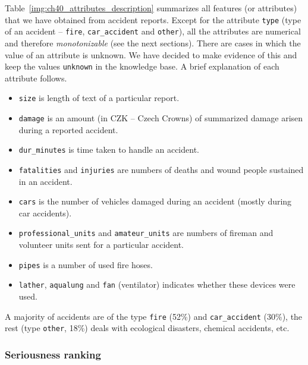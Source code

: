 Table~\ref{img:ch40_attributes_description} summarizes all features (or attributes) that we have obtained from accident reports. Except for the attribute \verb+type+ (type of an accident -- \verb+fire+, \verb+car_accident+ and \verb+other+), all the attributes are numerical and therefore \emph{monotonizable} (see the next sections). There are cases in which the value of an attribute is unknown. We have decided to make evidence of this and keep the values \verb+unknown+ in the knowledge base. A brief explanation of each attribute follows.
\begin{itemize}
	\item \verb+size+ is length of text of a particular report.
	\item \verb+damage+ is an amount (in CZK -- Czech Crowns) of summarized damage arisen during a reported accident.
	\item \verb+dur_minutes+ is time taken to handle an accident.
	\item \verb+fatalities+ and \verb+injuries+ are numbers of deaths and wound people sustained in an accident.
	\item \verb+cars+ is the number of vehicles damaged during an accident (mostly during car accidents).
	\item \verb+professional_units+ and \verb+amateur_units+ are numbers of fireman and volunteer units sent for a particular accident.
	\item \verb+pipes+ is a number of used fire hoses.
	\item \verb+lather+, \verb+aqualung+ and \verb+fan+ (ventilator) indicates whether these devices were used.
\end{itemize}

A majority of accidents are of the type \verb+fire+ (52\%)
and \verb+car_accident+ (30\%),
the rest (type \verb+other+, 18\%)
deals with ecological disasters, chemical accidents, etc.

\subsubsection{Seriousness ranking} \label{sec:ch40_seriousness}


